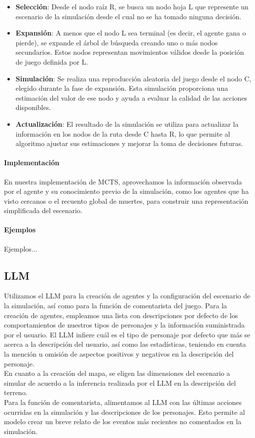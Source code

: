 \documentclass[11pt]{article}
\begin{document}
\begin{itemize}
    \item \textbf{Selección}: Desde el nodo raíz R, se busca un nodo hoja L que represente un escenario de la simulación desde el cual no se ha tomado ninguna decisión.
    \item \textbf{Expansión}: A menos que el nodo L sea terminal (es decir, el agente gana o pierde), se expande el árbol de búsqueda creando uno o más nodos secundarios. Estos nodos representan movimientos válidos desde la posición de juego definida por L.
    \item \textbf{Simulación}: Se realiza una reproducción aleatoria del juego desde el nodo C, elegido durante la fase de expansión. Esta simulación proporciona una estimación del valor de ese nodo y ayuda a evaluar la calidad de las acciones disponibles.
    \item \textbf{Actualización}: El resultado de la simulación se utiliza para actualizar la información en los nodos de la ruta desde C hasta R, lo que permite al algoritmo ajustar sus estimaciones y mejorar la toma de decisiones futuras.
\end{itemize}

\paragraph{Implementación}
En nuestra implementación de MCTS, aprovechamos la información observada por el agente y su conocimiento previo de la simulación, como los agentes que ha visto cercanos o el recuento global de muertes, para construir una representación simplificada del escenario.

\paragraph{Ejemplos}
Ejemplos...



\subsection{LLM}
Utilizamos el LLM para la creación de agentes y la configuración del escenario de la simulación, así como para la función de comentarista del juego. Para la creación de agentes, empleamos una lista con descripciones por defecto de los comportamientos de nuestros tipos de personajes y la información suministrada por el usuario. El LLM infiere cuál es el tipo de personaje por defecto que más se acerca a la descripción del usuario, así como las estadísticas, teniendo en cuenta la mención u omisión de aspectos positivos y negativos en la descripción del personaje.
\\
En cuanto a la creación del mapa, se eligen las dimensiones del escenario a simular de acuerdo a la inferencia realizada por el LLM en la descripción del terreno.  \\
Para la función de comentarista, alimentamos al LLM con las últimas acciones ocurridas en la simulación y las descripciones de los personajes. Esto permite al modelo crear un breve relato de los eventos más recientes no comentados en la simulación.
\end{document}

